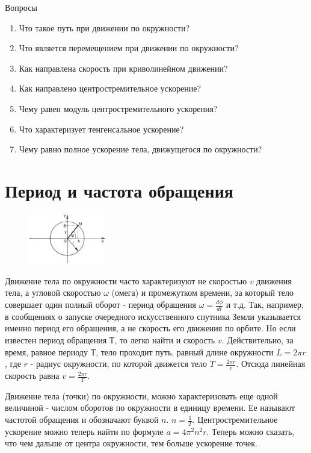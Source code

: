 \documentclass[a5paper, 10pt]{diss_4}
\renewcommand{\'}{\,'}
\begin{document}
\begin{center}
   Вопросы
\end{center}
\begin{enumerate}
\item Что такое путь при движении по окружности?
\item Что является перемещением при движении по окружности?
\item Как направлена скорость при криволинейном движении?
\item Как направлено центростремительное ускорение?
\item Чему равен модуль центростремительного ускорения?
\item Что характеризует тенгенсальное ускорение?
\item Чему равно полное ускорение тела, движущегося по окружности?
\end{enumerate}

\section{Период и частота обращения}

\begin{figure}
\includegraphics[width=0.3\textwidth]{img/img_23.eps}
\caption{}
\label{r63}
\end{figure}
  Движение тела по окружности часто характеризуют не скоростью $v$ движения
тела, а угловой скоростью $\omega$ (омега) и промежутком времени, за который
тело совершает один полный оборот - период обращения
$\omega=\frac{d\phi}{dt}$ и т.д. Так, например, в сообщениях о запуске
очередного искусственного спутника Земли указывается именно период его
обращения, а не скорость его движения по орбите. Но если известен период
обращения $Т$, то легко найти и скорость $v$. Действительно, за время, равное
периоду $Т$, тело проходит путь, равный длине окружности $L=2\pi r$, где $r$
- радиус окружности, по которой движется тело $T=\frac{2\pi r}{v}$. Отсюда
линейная скорость равна $v=\frac{2\pi r}{T}$.

  Движение тела (точки) по окружности, можно характеризовать еще одной
величиной - числом оборотов по окружности в единицу времени. Ее называют
частотой обращения и обозначают буквой $n$. $n=\frac{1}{T}$.
Центростремительное ускорение можно теперь найти по формуле $a=4\pi^2 n^2 r$.
Теперь можно сказать, что чем дальше от центра окружности, тем больше
ускорение точек.
\end{document}
